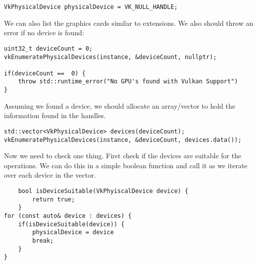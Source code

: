 \begin{center}
\begin{minipage}{0.95\linewidth}
\begin{lstlisting}
VkPhysicalDevice physicalDevice = VK_NULL_HANDLE;        
\end{lstlisting}
\end{minipage}
\end{center}

\par We can also list the graphics cards similar to extensions. We also should throw an error if no device is found:

\begin{center}
    \begin{minipage}{0.95\linewidth}
\begin{lstlisting}
uint32_t deviceCount = 0;
vkEnumeratePhysicalDevices(instance, &deviceCount, nullptr);

if(deviceCount ==  0) {
    throw std::runtime_error("No GPU's found with Vulkan Support")
}
\end{lstlisting}
\end{minipage}
\end{center}

\par Assuming we found a device, we should allocate an array/vector to hold the information found in the handles.

\begin{center}
\begin{minipage}{0.95\linewidth}
\begin{lstlisting}
std::vector<VkPhysicalDevice> devices(deviceCount);
vkEnumeratePhysicalDevices(instance, &deviceCount, devices.data());
\end{lstlisting}
\end{minipage}
\end{center}

\par Now we need to check one thing. First check if the devices are suitable for the operations. We can do this in a simple boolean function and call it as we iterate over each device in the vector.

\begin{center}
\begin{minipage}{0.95\linewidth}
\begin{lstlisting}
    bool isDeviceSuitable(VkPhyiscalDevice device) {
        return true;
    }
for (const auto& device : devices) {
    if(isDeviceSuitable(device)) {
        physicalDevice = device
        break;
    }
}
\end{lstlisting}
\end{minipage}
\end{center}

